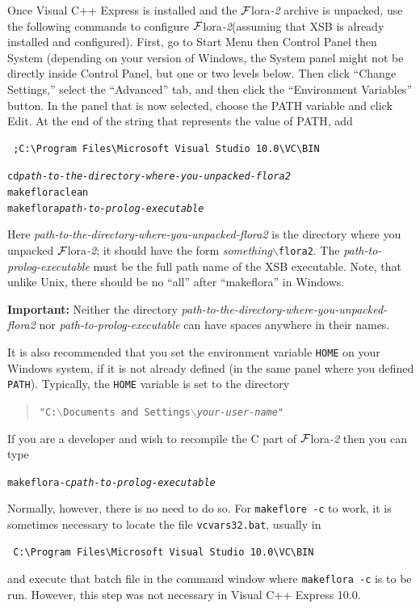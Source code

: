 \documentclass[11pt]{article}
\newcommand{\FLORA}{{\mbox{\sc ${\cal F}${lora}\rm\emph{-2}}}\xspace}
\begin{document}
Once Visual C++ Express is installed and the \FLORA archive is unpacked,
use the following commands to configure
\FLORA (assuming that XSB is already installed and configured).
First, go to Start Menu then Control Panel then System (depending on your
version of Windows, the System panel might not be directly inside Control
Panel, but one or two levels below. Then click ``Change Settings,'' select
the ``Advanced'' tab, and then click the ``Environment Variables'' button.
In the panel that is now selected,
choose the PATH variable and click Edit. At the end of the string that
represents the value of PATH, add
\begin{verbatim}
 ;C:\Program Files\Microsoft Visual Studio 10.0\VC\BIN
\end{verbatim}
\begin{alltt}
   cd \emph{path-to-the-directory-where-you-unpacked-flora2}
   makeflora clean
   makeflora \emph{path-to-prolog-executable}
\end{alltt}
Here \emph{path-to-the-directory-where-you-unpacked-flora2} is the directory 
where you unpacked \FLORA; it should have the form
\emph{something}$\backslash${\tt flora2}. The
\emph{path-to-prolog-executable} must be the full path name of the XSB
executable. Note, that unlike Unix, there should be no ``all'' after
``makeflora'' in Windows.

\textbf{Important:} Neither the directory
\emph{path-to-the-directory-where-you-unpacked-flora2} nor
\emph{path-to-prolog-executable} can have spaces anywhere in their names.

It is also recommended that you set the environment variable {\tt HOME} on
your Windows system, if it is not already defined (in the same panel where
you defined \texttt{PATH}).
Typically, the {\tt HOME} variable is set to the
directory
\begin{quote}
{\tt "C:$\backslash$Documents and Settings$\backslash$\emph{your-user-name}"} 
\end{quote}

If you are a developer and wish to recompile the C part of \FLORA
then you can type
\begin{alltt}
   makeflora -c \emph{path-to-prolog-executable}
\end{alltt}
Normally, however, there is no need to do so.
For \texttt{makeflore -c} to work,  
it is sometimes necessary to locate the file
{\tt vcvars32.bat},
usually in
\begin{verbatim}
 C:\Program Files\Microsoft Visual Studio 10.0\VC\BIN 
\end{verbatim}
and execute that batch file
in the command window where \texttt{makeflora -c} is to be
run. However, this step was not necessary in Visual
C++ Express 10.0.
\end{document}
